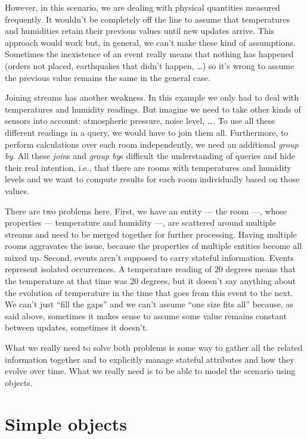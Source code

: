 \documentclass{report}
\begin{document}
However, in this scenario, we are dealing with physical quantities
measured frequently. It wouldn't be completely off the line to assume
that temperatures and humidities retain their previous values until
new updates arrive. This approach would work but, in general, we can't
make these kind of assumptions. Sometimes the inexistence of an event
really means that nothing has happened (orders not placed, earthquakes
that didn't happen, \ldots) so it's wrong to assume the previous value
remains the same in the general case.

Joining streams has another weakness. In this example we only had to
deal with temperatures and humidity readings. But imagine we need to
take other kinds of sensors into account: atmospheric pressure, noise
level, \ldots. To use all these different readings in a query, we
would have to join them all. Furthermore, to perform calculations over
each room independently, we need an additional \emph{group by}. All
these \emph{join}s and \emph{group by}s difficult the understanding of
queries and hide their real intention, i.e., that there are rooms with
temperatures and humidity levels and we want to compute results for
each room individually based on those values.

There are two problems here. First, we have an entity --- the room
---, whose properties --- temperature and humidity ---, are scattered
around multiple streams and need to be merged together for further
processing. Having multiple rooms aggravates the issue, because the
properties of multiple entities become all mixed up. Second, events
aren't supposed to carry stateful information. Events represent
isolated occurrences. A temperature reading of 20 degrees means that
the temperature at that time was 20 degrees, but it doesn't say
anything about the evolution of temperature in the time that goes from
this event to the next. We can't just ``fill the gaps'' and we can't
assume ``one size fits all'' because, as said above, sometimes it
makes sense to assume some value remains constant between updates,
sometimes it doesn't.

What we really need to solve both problems is some way to gather all
the related information together and to explicitly manage stateful
attributes and how they evolve over time. What we really need is to be
able to model the scenario using objects.

\section{Simple objects}
\label{sec:simple-objects}
\end{document}

